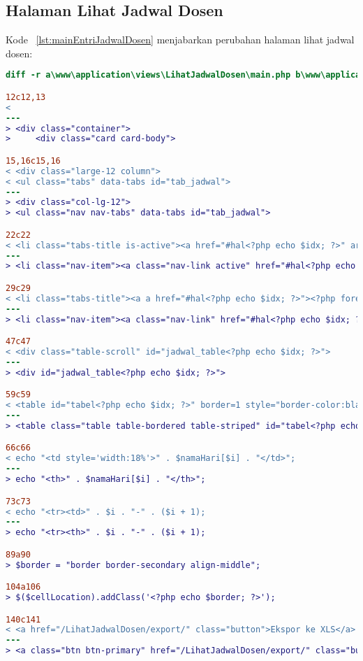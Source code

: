 \subsection{Halaman	Lihat Jadwal Dosen}
Kode ~\ref{lst:mainEntriJadwalDosen} menjabarkan perubahan halaman lihat jadwal dosen:
\begin{lstlisting}[language=diff, caption=Kode untuk Halaman Lihat Jadwal Dosen,  basicstyle=\ttfamily, frame=single,
columns=fullflexible, keepspaces=true, breaklines=true, label={lst:mainEntriJadwalDosen}]
diff -r a\www\application\views\LihatJadwalDosen\main.php b\www\application\views\LihatJadwalDosen\main.php

12c12,13
< 
---
> <div class="container">
>     <div class="card card-body">

15,16c15,16
< <div class="large-12 column">
< <ul class="tabs" data-tabs id="tab_jadwal">
---
> <div class="col-lg-12">
> <ul class="nav nav-tabs" data-tabs id="tab_jadwal">

22c22
< <li class="tabs-title is-active"><a href="#hal<?php echo $idx; ?>" aria-selected="true"><?php foreach ($currRow as $data) {
---
> <li class="nav-item"><a class="nav-link active" href="#hal<?php echo $idx; ?>" aria-selected="true"><?php foreach ($currRow as $data) {

29c29
< <li class="tabs-title"><a a href="#hal<?php echo $idx; ?>"><?php foreach ($currRow as $data) {
---
> <li class="nav-item"><a class="nav-link" href="#hal<?php echo $idx; ?>"><?php foreach ($currRow as $data) {

47c47
< <div class="table-scroll" id="jadwal_table<?php echo $idx; ?>">
---
> <div id="jadwal_table<?php echo $idx; ?>">

59c59
< <table id="tabel<?php echo $idx; ?>" border=1 style="border-color:black ; border-collapse:separate">
---
> <table class="table table-bordered table-striped" id="tabel<?php echo $idx; ?>" >

66c66
< echo "<td style='width:18%'>" . $namaHari[$i] . "</td>";
---
> echo "<th>" . $namaHari[$i] . "</th>";

73c73
< echo "<tr><td>" . $i . "-" . ($i + 1);
---
> echo "<tr><th>" . $i . "-" . ($i + 1);

89a90
> $border = "border border-secondary align-middle";

104a106
> $($cellLocation).addClass('<?php echo $border; ?>');

140c141
< <a href="/LihatJadwalDosen/export/" class="button">Ekspor ke XLS</a>
---
> <a class="btn btn-primary" href="/LihatJadwalDosen/export/" class="button">Ekspor ke XLS</a>
\end{lstlisting}

